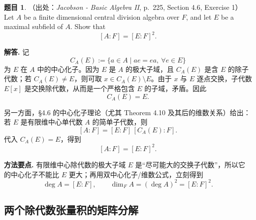 \documentclass[a4paper]{ctexart}
\theoremstyle{definition}
\newtheorem{example}{题目}[section]
\theoremstyle{analysis}
\theoremstyle{plain}
\begin{document}
\begin{example}
（出处：\textit{Jacobson - Basic Algebra II}, p.~225, Section 4.6, Exercise 1）
Let \(A\) be a finite dimensional central division algebra over \(F\), and let
\(E\) be a maximal subfield of \(A\). Show that
\[
  [A:F]=[E:F]^2.
\]

\textbf{解答.}
记
\[
  C_A(E):=\{a\in A\mid ae=ea,\ \forall e\in E\}
\]
为 \(E\) 在 \(A\) 中的中心化子。因为 \(E\) 是 \(A\) 的极大子域，且 \(C_A(E)\) 是含 \(E\) 的除子代数；若 \(C_A(E)\neq E\)，则可取 \(x\in C_A(E)\setminus E\)。由于 \(x\) 与 \(E\) 逐点交换，子代数 \(E[x]\) 是交换除代数，从而是一个严格包含 \(E\) 的子域，矛盾。因此
\[
  C_A(E)=E.
\]

另一方面，§4.6 的中心化子理论（尤其 Theorem 4.10 及其后的维数关系）给出：若 \(E\) 是有限维中心单代数 \(A\) 的简单子代数，则
\[
  [A:F]=[E:F]\,[C_A(E):F].
\]
代入 \(C_A(E)=E\)，得到
\[
  [A:F]=[E:F]^2.
\]

\textbf{方法要点.}
有限维中心除代数的极大子域 \(E\) 是“尽可能大的交换子代数”，所以它的中心化子不能比 \(E\) 更大；再用双中心化子/维数公式，立刻得到
\[
  \deg A=[E:F],
  \qquad
  \dim_F A=(\deg A)^2=[E:F]^2.
\]
\end{example}

\subsection{两个除代数张量积的矩阵分解}\label{subsec:problem-tensor-division-coprime}
\end{document}
